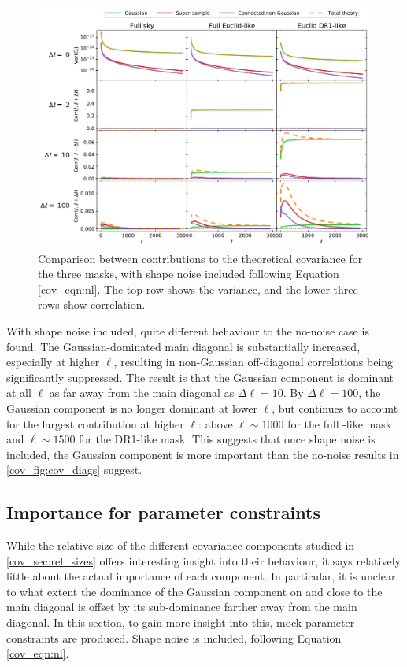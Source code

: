 \begin{figure}
\includegraphics[width=\textwidth]{cov_diags_withnoise}
\caption{Comparison between contributions to the theoretical covariance for the three masks, with shape noise included
following Equation \eqref{cov_eqn:nl}. The top row shows the variance, and the lower three rows show correlation.}
\label{cov_fig:cov_diags_withnoise}
\end{figure}

With shape noise included, quite different behaviour to the no-noise case is found. The Gaussian-dominated main diagonal is substantially increased, especially at higher $\ell$, resulting in non-Gaussian off-diagonal correlations being significantly suppressed.
The result is that the Gaussian component is dominant at all $\ell$ as far away from the main diagonal as $\Delta \ell = 10$.
By $\Delta \ell = 100$, the Gaussian component is no longer dominant at lower $\ell$, but continues to account for the largest contribution at higher $\ell$: above $\ell \sim 1000$ for the full \Euclid{}-like mask and $\ell \sim 1500$ for the \Euclid{} DR1-like mask. This suggests that once shape noise is included, the Gaussian component is more important than the no-noise results in \autoref{cov_fig:cov_diags} suggest.

\subsection{Importance for parameter constraints}
\label{cov_sec:params}

While the relative size of the different covariance components studied in \autoref{cov_sec:rel_sizes} offers interesting insight into their behaviour, it says relatively little about the actual importance of each component. In particular, it is unclear to what extent the dominance of the Gaussian component on and close to the main diagonal is offset by its sub-dominance farther away from the main diagonal.
In this section, to gain more insight into this, mock parameter constraints are produced. Shape noise is included, following Equation \eqref{cov_eqn:nl}.

